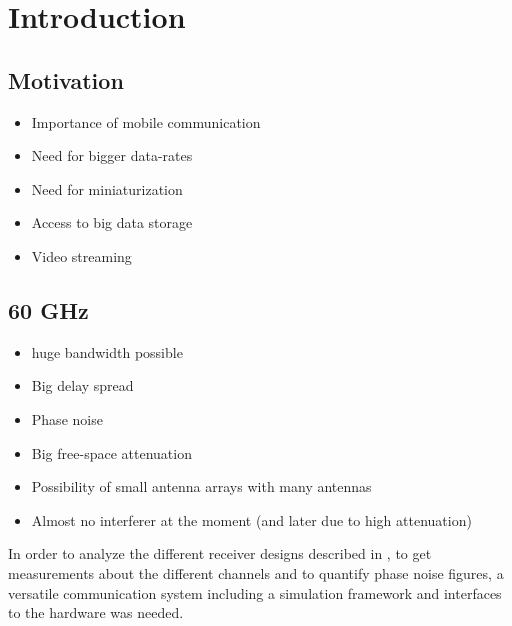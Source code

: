 \chapter{Introduction}
\label{ch:introduction}

\section{Motivation}

\begin{itemize}
\item Importance of mobile communication
\item Need for bigger data-rates
\item Need for miniaturization
\item Access to big data storage
\item Video streaming
\end{itemize}

\section{60 GHz}

\begin{itemize}
\item huge bandwidth possible
\item Big delay spread
\item Phase noise
\item Big free-space attenuation
\item Possibility of small antenna arrays with many antennas
\item Almost no interferer at the moment (and later due to high attenuation)
\end{itemize}

In order to analyze the different receiver designs described in
, to get measurements about the different channels
and to quantify phase noise figures, a versatile communication system
including a simulation framework and interfaces to the hardware
was needed. \\


